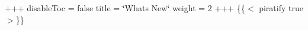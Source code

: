 +++ disable\+Toc = false title = \char`\"{}\+What\textquotesingle{}s New\char`\"{} weight = 2 +++ \{\{$<$ piratify true $>$\}\} 
